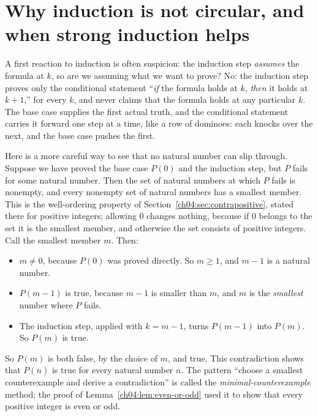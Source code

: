 \section{Why induction is not circular, and when strong induction helps}\label{ch05:sec:not-circular}
A first reaction to induction is often suspicion: the induction step \emph{assumes} the formula at $k$, so are we assuming what we want to prove? No: the induction step proves only the conditional statement ``\emph{if} the formula holds at $k$, \emph{then} it holds at $k+1$,'' for every $k$, and never claims that the formula holds at any particular $k$. The base case supplies the first actual truth, and the conditional statement carries it forward one step at a time, like a row of dominoes: each knocks over the next, and the base case pushes the first.

Here is a more careful way to see that no natural number can slip through. Suppose we have proved the base case $P(0)$ and the induction step, but $P$ fails for some natural number. Then the set of natural numbers at which $P$ fails is nonempty, and every nonempty set of natural numbers has a smallest member. This is the well-ordering property of Section~\ref{ch04:sec:contrapositive}, stated there for positive integers; allowing $0$ changes nothing, because if $0$ belongs to the set it is the smallest member, and otherwise the set consists of positive integers. Call the smallest member $m$. Then:
\begin{itemize}
\item $m\ne0$, because $P(0)$ was proved directly. So $m\ge1$, and $m-1$ is a natural number.
\item $P(m-1)$ is true, because $m-1$ is smaller than $m$, and $m$ is the \emph{smallest} number where $P$ fails.
\item The induction step, applied with $k=m-1$, turns $P(m-1)$ into $P(m)$. So $P(m)$ is true.
\end{itemize}
So $P(m)$ is both false, by the choice of $m$, and true. This contradiction shows that $P(n)$ is true for every natural number $n$. The pattern ``choose a smallest counterexample and derive a contradiction'' is called the \emph{minimal-counterexample} method; the proof of Lemma~\ref{ch04:lem:even-or-odd} used it to show that every positive integer is even or odd.

